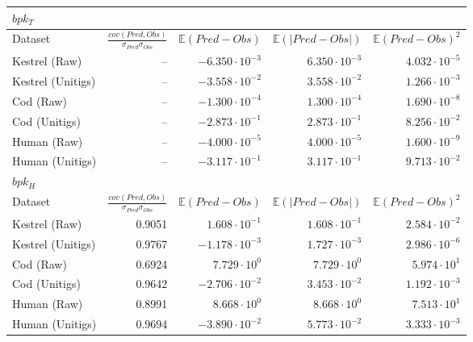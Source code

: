 \begin{tabular}{lrrrr}
\toprule
\textbf{$bpk_T$} & & & & \\
\midrule
Dataset & $\frac{cov(Pred,Obs)}{\sigma_{Pred} \sigma_{Obs}}$ & $\mathbb{E}(Pred-Obs)$ & $\mathbb{E}(|Pred-Obs|)$ & $\mathbb{E}(Pred-Obs)^2$ \\
\midrule
Kestrel (Raw) & -- & $-6.350 \cdot 10^{-3}$ & $6.350 \cdot 10^{-3}$ & $4.032 \cdot 10^{-5}$ \\
Kestrel (Unitigs) & -- & $-3.558 \cdot 10^{-2}$ & $3.558 \cdot 10^{-2}$ & $1.266 \cdot 10^{-3}$ \\
Cod (Raw) & -- & $-1.300 \cdot 10^{-4}$ & $1.300 \cdot 10^{-4}$ & $1.690 \cdot 10^{-8}$ \\
Cod (Unitigs) & -- & $-2.873 \cdot 10^{-1}$ & $2.873 \cdot 10^{-1}$ & $8.256 \cdot 10^{-2}$ \\
Human (Raw) & -- & $-4.000 \cdot 10^{-5}$ & $4.000 \cdot 10^{-5}$ & $1.600 \cdot 10^{-9}$ \\
Human (Unitigs) & -- & $-3.117 \cdot 10^{-1}$ & $3.117 \cdot 10^{-1}$ & $9.713 \cdot 10^{-2}$ \\
\midrule
\midrule
\textbf{$bpk_H$} & & & & \\
\midrule
Dataset & $\frac{cov(Pred,Obs)}{\sigma_{Pred} \sigma_{Obs}}$ & $\mathbb{E}(Pred-Obs)$ & $\mathbb{E}(|Pred-Obs|)$ & $\mathbb{E}(Pred-Obs)^2$ \\
\midrule
Kestrel (Raw) & 0.9051 & $1.608 \cdot 10^{-1}$ & $1.608 \cdot 10^{-1}$ & $2.584 \cdot 10^{-2}$ \\
Kestrel (Unitigs) & 0.9767 & $-1.178 \cdot 10^{-3}$ & $1.727 \cdot 10^{-3}$ & $2.986 \cdot 10^{-6}$ \\
Cod (Raw) & 0.6924 & $7.729 \cdot 10^{0}$ & $7.729 \cdot 10^{0}$ & $5.974 \cdot 10^{1}$ \\
Cod (Unitigs) & 0.9642 & $-2.706 \cdot 10^{-2}$ & $3.453 \cdot 10^{-2}$ & $1.192 \cdot 10^{-3}$ \\
Human (Raw) & 0.8991 & $8.668 \cdot 10^{0}$ & $8.668 \cdot 10^{0}$ & $7.513 \cdot 10^{1}$ \\
Human (Unitigs) & 0.9694 & $-3.890 \cdot 10^{-2}$ & $5.773 \cdot 10^{-2}$ & $3.333 \cdot 10^{-3}$ \\
\bottomrule
\end{tabular}
